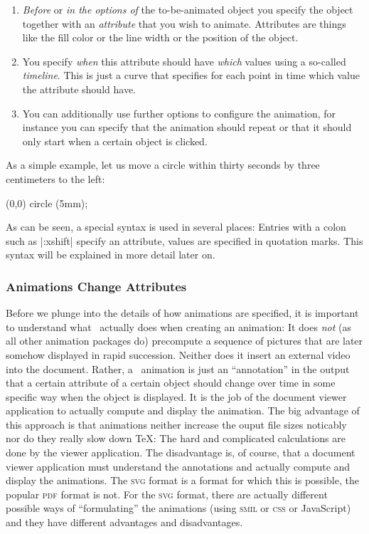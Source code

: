 \begin{enumerate}
\item \emph{Before} or \emph{in the options of} the to-be-animated
  object you specify the object together with an \emph{attribute}
  that you wish to animate. Attributes are things like the fill color
  or the line width or the position of the object.
\item You specify \emph{when} this attribute should have \emph{which}
  values using a so-called \emph{timeline}. This is just a curve that
  specifies for each point in time which value the attribute should
  have.
\item You can additionally use further options to configure
  the animation, for instance you can specify that the animation
  should repeat or that it should only start when a certain object is
  clicked. 
\end{enumerate}

As a simple example, let us move a circle within thirty seconds by three
centimeters to the left:

\begin{codeexample}[width=2cm]
\tikz \draw [animate me = {:xshift = {0s = "0cm", 30s = "-3cm"}}] (0,0) circle (5mm);
\end{codeexample}

As can be seen, a special syntax is used in several places: Entries
with a colon such as |:xshift| specify an attribute, values
are specified in quotation marks. This syntax will be explained in 
more detail later on. 


\subsubsection{Animations Change Attributes}

Before we plunge into the details of how animations are specified, it
is important to understand what 
\tikzname\ actually does when creating an animation: It does
\emph{not} (as all other animation packages do) precompute a sequence of
pictures that are later somehow displayed in rapid succession. Neither
does it insert an external video into the document. Rather, a
\tikzname\ animation is just an ``annotation'' in the output that a
certain attribute of a certain object should change over time in some
specific way when the object is displayed. It is the job of the
document viewer application to actually compute and display the
animation. The big advantage of this approach is that animations neither
increase the ouput file sizes noticably nor do they really slow down
\TeX: The hard and complicated calculations are done by the viewer
application. The disadvantage is, of course, that a document viewer
application must understand the annotations and actually compute and
display the animations. The \textsc{svg} format is a format for which
this is possible, the popular \textsc{pdf} format is not. For the
\textsc{svg} format, there are actually different possible ways of
``formulating'' the animations (using \textsc{smil} or \textsc{css} or
JavaScript) and they have different advantages and disadvantages.

